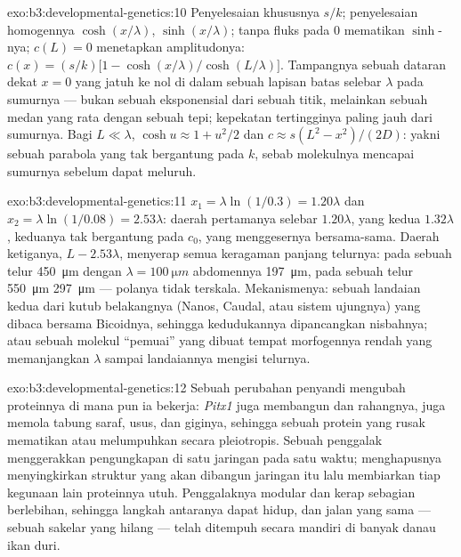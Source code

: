 \begin{solution}{exo:b3:developmental-genetics:10}
Penyelesaian khususnya $s/k$; penyelesaian homogennya $\cosh(x/\lambda)$,
$\sinh(x/\lambda)$; tanpa fluks pada $0$ mematikan $\sinh$-nya; $c(L) = 0$ menetapkan
amplitudonya: $c(x) = (s/k)\bigl[1 - \cosh(x/\lambda)/\cosh(L/\lambda)\bigr]$.
Tampangnya sebuah dataran dekat $x = 0$ yang jatuh ke nol di dalam sebuah lapisan
batas selebar $\lambda$ pada sumurnya --- bukan sebuah eksponensial dari sebuah
titik, melainkan sebuah medan yang rata dengan sebuah tepi; kepekatan tertingginya paling jauh
dari sumurnya. Bagi $L \ll \lambda$, $\cosh u \approx 1 +
u^{2}/2$ dan $c \approx s(L^{2} - x^{2})/(2D)$: yakni sebuah parabola yang tak bergantung
pada $k$, sebab molekulnya mencapai sumurnya sebelum dapat meluruh.
\end{solution}

\begin{solution}{exo:b3:developmental-genetics:11}
$x_{1} = \lambda\ln(1/0.3) = 1.20\lambda$ dan $x_{2} = \lambda\ln(1/0.08)
= 2.53\lambda$: daerah pertamanya selebar $1.20\lambda$, yang kedua
$1.32\lambda$, keduanya tak bergantung pada $c_{0}$, yang menggesernya bersama-sama.
Daerah ketiganya, $L - 2.53\lambda$, menyerap semua keragaman panjang
telurnya: pada sebuah telur \qty{450}{\micro m} dengan $\lambda = \qty{100}{\micro m}$
abdomennya \qty{197}{\micro m}, pada sebuah telur \qty{550}{\micro m}
\qty{297}{\micro m} --- polanya tidak terskala. Mekanismenya: sebuah landaian
kedua dari kutub belakangnya (Nanos, Caudal, atau sistem ujungnya) yang dibaca
bersama Bicoidnya, sehingga kedudukannya dipancangkan nisbahnya; atau sebuah molekul
``pemuai'' yang dibuat tempat morfogennya rendah yang memanjangkan $\lambda$ sampai landaiannya mengisi telurnya.
\end{solution}

\begin{solution}{exo:b3:developmental-genetics:12}
Sebuah perubahan penyandi mengubah proteinnya di mana pun ia bekerja: \emph{Pitx1} juga
membangun  dan rahangnya, \emph{} juga memola
tabung saraf, usus, dan giginya, sehingga sebuah protein yang rusak mematikan atau
melumpuhkan secara pleiotropis. Sebuah penggalak menggerakkan pengungkapan di satu jaringan
pada satu waktu; menghapusnya menyingkirkan struktur yang akan dibangun jaringan itu
lalu membiarkan tiap kegunaan lain proteinnya utuh. Penggalaknya
modular dan kerap sebagian berlebihan, sehingga langkah antaranya dapat hidup,
dan jalan yang sama --- sebuah sakelar yang hilang --- telah ditempuh secara mandiri di
banyak danau ikan duri.
\end{solution}

